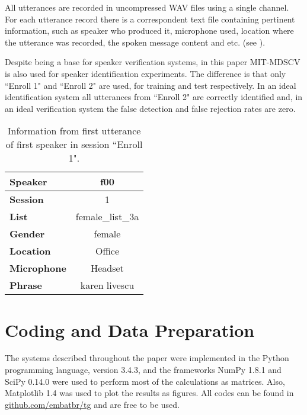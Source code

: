 All utterances are recorded in uncompressed WAV files using a single channel. For each utterance record there is a correspondent text file containing pertinent information, such as speaker who produced it, microphone used, location where the utterance was recorded, the spoken message content and etc. (see ).

Despite being a base for speaker verification systems, in this paper MIT-MDSCV is also used for speaker identification experiments. The difference is that only ``Enroll 1" and ``Enroll 2" are used, for training and test respectively. In an ideal identification system all utterances from ``Enroll 2" are correctly identified and, in an ideal verification system the false detection and false rejection rates are zero.

\begin{table}[h]
    \small
    \centering
    \begin{tabular}{|l|c|}
    \hline
    {\bf Speaker}    & f00              \\ \hline
    {\bf Session}    & 1                \\ \hline
    {\bf List}       & female\_list\_3a \\ \hline
    {\bf Gender}     & female           \\ \hline
    {\bf Location}   & Office           \\ \hline
    {\bf Microphone} & Headset          \\ \hline
    {\bf Phrase}     & karen livescu    \\ \hline
    \end{tabular}
    \caption{Information from first utterance of first speaker in session ``Enroll 1".}
    \label{tab:utterance-info}
\end{table}

\section{Coding and Data Preparation}
\label{sec:coding-and-data-preparation}

The systems described throughout the paper were implemented in the Python programming language, version 3.4.3, and the frameworks NumPy 1.8.1 and SciPy 0.14.0 were used to perform most of the calculations as matrices. Also, Matplotlib 1.4 was used to plot the results as figures. All codes can be found in \url{github.com/embatbr/tg} and are free to be used.

